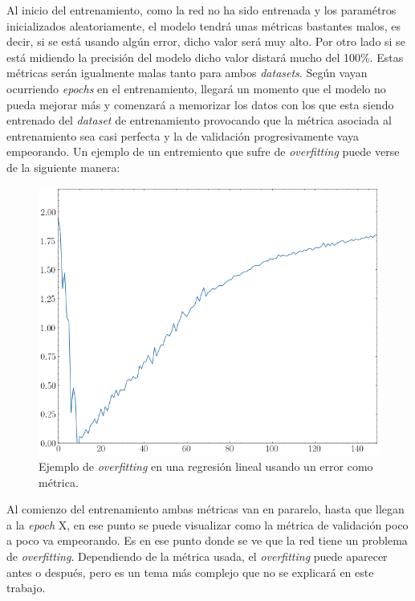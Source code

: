 Al inicio del entrenamiento, como la red no ha sido entrenada y los paramétros inicializados aleatoriamente, el modelo tendrá unas métricas bastantes malos, es decir, si se está usando algún error, dicho valor será muy alto. Por otro lado si se está midiendo la precisión del modelo dicho valor distará mucho del 100\%. Estas métricas serán igualmente malas tanto para ambos \textit{datasets}. Según vayan ocurriendo \textit{epochs} en el entrenamiento, llegará un momento que el modelo no pueda mejorar más y comenzará a memorizar los datos con los que esta siendo entrenado del \textit{dataset} de entrenamiento provocando que la métrica asociada al entrenamiento sea casi perfecta y la de validación progresivamente vaya empeorando. Un ejemplo de un entremiento que sufre de \textit{overfitting} puede verse de la siguiente manera:
\newline

\begin{figure}[H]
    \centering
    \includegraphics[width=12cm]{images/state-of-art/overfitting/overfitting-loss.png}
    \caption{Ejemplo de \textit{overfitting} en una regresión lineal usando un error como métrica.}
    \label{fig:basic_network}
\end{figure}

Al comienzo del entrenamiento ambas métricas van en pararelo, hasta que llegan a la \textit{epoch} X, en ese punto se puede visualizar como la métrica de validación poco a poco va empeorando. Es en ese punto donde se ve que la red tiene un problema de \textit{overfitting}. Dependiendo de la métrica usada, el \textit{overfitting} puede aparecer antes o después, pero es un tema más complejo que no se explicará en este trabajo.
\newline

